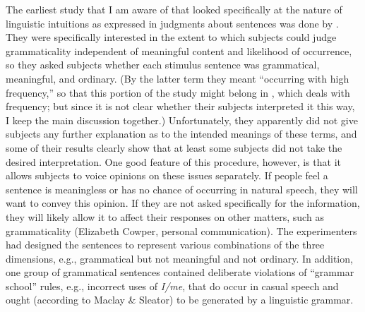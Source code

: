 The earliest study that I am aware of that looked specifically at the nature of linguistic intuitions as expressed in judgments about sentences was done by \citet{MaclayEtAl1960}. They were specifically interested in the extent to which subjects could judge grammaticality independent of meaningful content and likelihood of occurrence, so they asked subjects whether each stimulus sentence was grammatical, meaningful, and ordinary. (By the latter term they meant ``occurring with high frequency,'' so that this portion of the study might belong in , which deals with frequency; but since it is not clear whether their subjects interpreted it this way, I keep the main discussion together.) Unfortunately, they apparently did not give subjects any further explanation as to the intended meanings of these terms, and some of their results clearly show that at least some subjects did not take the desired interpretation. One good feature of this procedure, however, is that it allows subjects to voice opinions on these issues separately. If people feel a sentence is meaningless or has no chance of occurring in natural speech, they will want to convey this opinion. If they are not asked specifically for the information, they will likely allow it to affect their responses on other matters, such as grammaticality (Elizabeth Cowper, personal communication). The experimenters had designed the sentences to represent various combinations of the three dimensions, e.g., grammatical but not meaningful and not ordinary. In addition, one group of grammatical sentences contained deliberate violations of ``grammar school'' rules, e.g., incorrect uses of \textit{I/me}, that do occur in casual speech and ought (according to Maclay \& Sleator) to be generated by a linguistic grammar.


